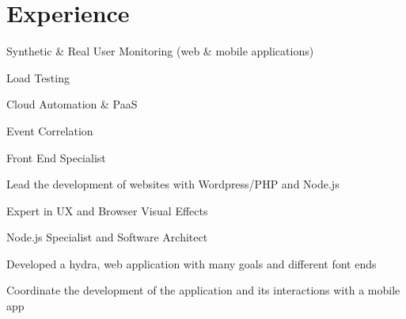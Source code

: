 \documentclass[letterpaper]{deedy-resume} %
\begin{document}
\hfill
%
%
\begin{minipage}[t]{0.66\textwidth} %


\section{Experience}


\vspace{\topsep} %
\begin{tightitemize}
\item Synthetic \& Real User Monitoring (web \& mobile applications)
\item Load Testing
\item Cloud Automation \& PaaS
\item Event Correlation
\end{tightitemize}

\sectionspace %


\begin{tightitemize}
\item Front End Specialist
\item Lead the development of websites with Wordpress/PHP and Node.js
\item Expert in UX and Browser Visual Effects
\end{tightitemize}

\sectionspace %


\begin{tightitemize}
\item Node.js Specialist and Software Architect
\item Developed a hydra, web application with many goals and different font ends
\item Coordinate the development of the application and its interactions with a mobile app
\end{tightitemize}


\end{minipage}
\end{document}
